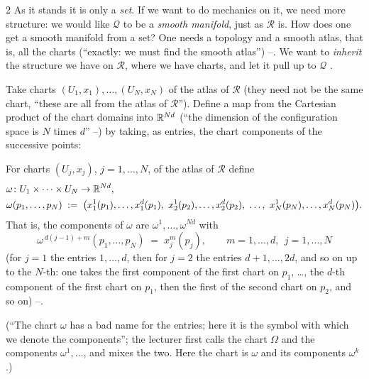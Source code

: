 \begin{paracol}{2}
As it stands it is only a \emph{set}. If we want to do mechanics on it, we need more structure: we would like $\mathcal Q$ to be a \emph{smooth manifold}, just as $\mathcal R$ is. How does one get a smooth manifold from a set? One needs a topology and a smooth atlas, that is, all the charts (``exactly: we must find the smooth atlas'') --. We want to \emph{inherit} the structure we have on $\mathcal R$, where we have charts, and let it pull up to $\mathcal Q$ .

Take charts $(U_1,x_1),\dots,(U_N,x_N)$ of the atlas of $\mathcal R$ (they need not be the same chart, ``these are all from the atlas of $\mathcal R$''). Define a map from the Cartesian product of the chart domains into $\mathbb{R}^{Nd}$ (``the dimension of the configuration space is $N$ times $d$'' --) by taking, as entries, the chart components of the successive points:

\begin{definition}\label{def:mp-omega}
For charts $(U_j,x_j)$, $j=1,\dots,N$, of the atlas of $\mathcal R$ define
\begin{equation}\label{eq:mp-omega}
  \begin{aligned}
  &\omega\colon U_1\times\dots\times U_N\to\R^{Nd},\\
  &\omega(p_1,\dots,p_N)\;:=\;\bigl(x_1^1(p_1),\dots,x_1^d(p_1),\ x_2^1(p_2),\dots,x_2^d(p_2),\ \dots,\ x_N^1(p_N),\dots,x_N^d(p_N)\bigr).
  \end{aligned}
\end{equation}
That is, the components of $\omega$ are $\omega^1,\dots,\omega^{Nd}$ with
\begin{equation}\label{eq:mp-omegacomp}
  \omega^{\,d(j-1)+m}(p_1,\dots,p_N)\;=\;x_j^m(p_j),\qquad m=1,\dots,d,\ \ j=1,\dots,N
\end{equation}
(for $j=1$ the entries $1,\dots,d$, then for $j=2$ the entries $d+1,\dots,2d$, and so on up to the $N$-th: one takes the first component of the first chart on $p_1$, \dots, the $d$-th component of the first chart on $p_1$, then the first of the second chart on $p_2$, and so on) --.
\end{definition}
(``The chart $\omega$ has a bad name for the entries; here it is the symbol with which we denote the components''; the lecturer first calls the chart $\Omega$ and the components $\omega^1,\dots$, and mixes the two. Here the chart is $\omega$ and its components $\omega^k$.)


\end{paracol}
